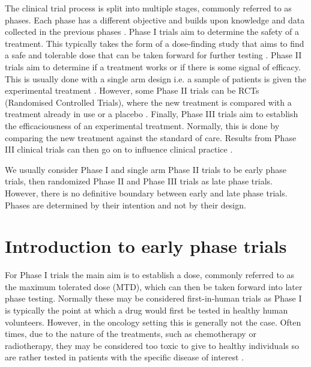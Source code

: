 The clinical trial process is split into multiple stages, commonly referred to as phases. Each phase has a different objective and builds upon knowledge and data collected in the previous phases \cite{wrightChapterClinicalTrial2017}. Phase I trials aim to determine the safety of a treatment. This typically takes the form of a dose-finding study that aims to find a safe and tolerable dose that can be taken forward for further testing \cite{iasonosRandomisedPhaseClinical2021}. Phase II trials aim to determine if a treatment works or if there is some signal of efficacy. This is usually done with a single arm design i.e. a sample of patients is given the experimental treatment \cite{esteyNewDesignsPhase2003}. However, some Phase II trials can be RCTs (Randomised Controlled Trials), where the new treatment is compared with a treatment already in use or a placebo \cite{mandrekarRandomizedPhaseII2010}. Finally, Phase III trials aim to establish the efficaciousness of an experimental treatment. Normally, this is done by comparing the new treatment against the standard of care. Results from Phase III clinical trials can then go on to 
influence clinical practice \cite{umscheidKeyConceptsClinical2011}.

We usually consider Phase I and single arm Phase II trials to be early phase trials, then randomized Phase II and Phase III trials as late phase trials. However, there is no definitive boundary between early and late phase trials. Phases are determined by their intention and not by their design.

\section{Introduction to early phase trials}

For Phase \RN{1} trials the main aim is to establish a dose, commonly referred to as the maximum tolerated dose (MTD), which can then be taken forward into later phase testing. Normally these may be considered first-in-human trials as Phase \RN{1} is typically the point at which a drug would first be tested in healthy human volunteers. However, in the oncology setting this is generally not the case. Often times, due to the nature of the treatments, such as chemotherapy or radiotherapy, they may be considered too toxic to give to healthy individuals so are rather tested in patients with the specific disease of interest \cite{salzbergFirstinHumanPhaseStudies2012}. 

